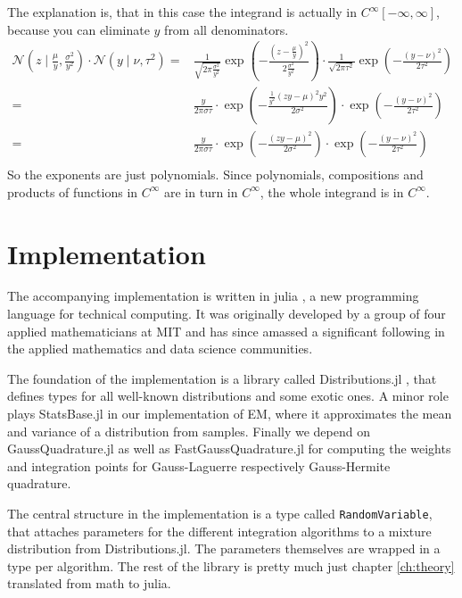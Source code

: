 \documentclass[11pt,a4paper]{book}
\newcommand{\injulia}[1]{\texttt{#1}}
\begin{document}
The explanation is, that in this case the integrand is actually in
$C^{\infty}[-\infty, \infty]$, because you can eliminate $y$ from all
denominators.
\begin{align*}
  \mathcal{N}\left( z \mid \frac{\mu}{y}, \frac{\sigma^{2}}{y^{2}} \right) \cdot \mathcal{N}(y \mid \nu, \tau^{2}) = & \frac{1}{\sqrt{2 \pi \frac{\sigma^{2}}{y^{2}}}} \exp\left( -\frac{\left( z - \frac{\mu}{y} \right)^{2}}{2\frac{\sigma^{2}}{y^{2}}} \right) \cdot \frac{1}{\sqrt{2 \pi \tau^{2}}} \exp\left( -\frac{(y - \nu)^{2}}{2\tau^{2}} \right)\\
  = & \frac{y}{2\pi\sigma\tau} \cdot \exp\left( -\frac{\frac{1}{y^{2}}\left( zy - \mu \right)^{2}y^{2}}{2\sigma^{2}} \right) \cdot \exp\left( -\frac{(y - \nu)^{2}}{2\tau^{2}} \right)\\
  = & \frac{y}{2\pi\sigma\tau} \cdot \exp\left( -\frac{\left( zy - \mu \right)^{2}}{2\sigma^{2}} \right) \cdot \exp\left( -\frac{(y - \nu)^{2}}{2\tau^{2}} \right)\\
\end{align*}
So the exponents are just polynomials. Since polynomials, compositions and
products of functions in $C^{\infty}$ are in turn in $C^{\infty}$, the whole
integrand is in $C^{\infty}$.

\chapter{Implementation}
\label{ch:implementation}

The accompanying implementation is written in julia \cite{julia}, a new
programming language for technical computing. It was originally developed by a
group of four applied mathematicians at MIT and has since amassed a significant
following in the applied mathematics and data science communities.

The foundation of the implementation is a library called Distributions.jl
\cite{distributionsjl}, that defines types for all well-known distributions and
some exotic ones. A minor role plays StatsBase.jl \cite{statsbasejl} in our
implementation of EM, where it approximates the mean and variance of a
distribution from samples. Finally we depend on GaussQuadrature.jl \cite{gq} as
well as FastGaussQuadrature.jl \cite{fastgq} for computing the weights and
integration points for Gauss-Laguerre respectively Gauss-Hermite quadrature.

The central structure in the implementation is a type called
\injulia{RandomVariable}, that attaches parameters for the different integration
algorithms to a mixture distribution from Distributions.jl. The parameters
themselves are wrapped in a type per algorithm. The rest of the library is
pretty much just chapter \ref{ch:theory} translated from math to julia.
\end{document}
